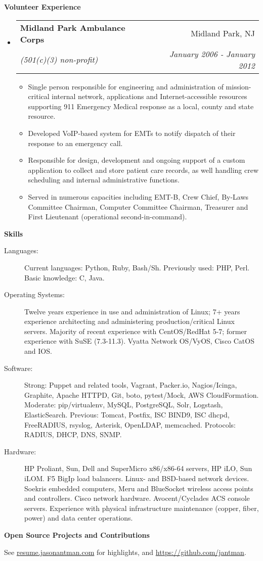 \documentclass[letterpaper,11pt]{article}
\makeatletter
\newcommand{\resitem}[1]{\item #1 \vspace{-2pt}}
\newcommand{\resheading}[1]{{\large \colorbox{mygrey}{\begin{minipage}{\textwidth}{\textbf{#1 \vphantom{p\^{E}}}}\end{minipage}}}}
\newcommand{\ressubheading}[4]{
\begin{tabular*}{7.0in}{l@{\extracolsep{\fill}}r}
		\textbf{#1} & #2 \\
		\textit{#3} & \textit{#4} \\
\end{tabular*}\vspace{-6pt}}
\makeatother
\begin{document}
\resheading{Volunteer Experience}
\begin{itemize}
\item
        \ressubheading{Midland Park Ambulance Corps}{Midland Park, NJ}{(501(c)(3) non-profit)}{January 2006 - January 2012}
        \begin{itemize}
                \resitem{Single person responsible for engineering and administration of
                  mission-critical internal network, applications and
                  Internet-accessible resources supporting 911 Emergency
                  Medical response as a local, county and state resource.}
                \resitem{Developed VoIP-based system for EMTs to notify
                  dispatch of their response to an emergency call.}
                \resitem{Responsible for design, development and ongoing support of a custom application to
                  collect and store patient care records, as well handling crew scheduling and internal
                  administrative functions.}
                \resitem{Served in numerous capacities including EMT-B, Crew Chief,
                  By-Laws Committee Chairman, Computer Committee Chairman,
                  Treasurer and First Lieutenant (operational second-in-command).}
        \end{itemize}
\end{itemize}

\resheading{Skills}

\begin{description}
\item[Languages:]
Current languages: Python, Ruby, Bash/Sh. Previously used: PHP, Perl. Basic knowledge: C, Java.
\item[Operating Systems:]
Twelve years experience in use and administration of Linux; 7+ years experience architecting and administering production/critical Linux servers.
Majority of recent experience with CentOS/RedHat 5-7; former experience with SuSE
(7.3-11.3). Vyatta Network OS/VyOS, Cisco CatOS and IOS.
\item[Software:]
Strong: Puppet and related tools, Vagrant, Packer.io, Nagios/Icinga, Graphite, Apache HTTPD, Git, boto, pytest/Mock, AWS CloudFormation.
Moderate: pip/virtualenv, MySQL, PostgreSQL, Solr, Logstash, ElasticSearch.
Previous: Tomcat, Postfix, ISC BIND9, ISC dhcpd, FreeRADIUS, rsyslog, Asterisk, OpenLDAP, memcached. Protocols: RADIUS, DHCP, DNS, SNMP.

\item[Hardware:]
HP Proliant, Sun, Dell and SuperMicro x86/x86-64 servers, HP iLO, Sun iLOM. F5 BigIp load balancers. Linux- and
BSD-based network devices. Soekris embedded computers, Meru and BlueSocket
wireless access points and controllers. Cisco network hardware. Avocent/Cyclades ACS console servers. Experience with physical infrastructure maintenance (copper, fiber, power) and data center operations.
\end{description}

\resheading{Open Source Projects and Contributions}
\begin{description}
\item{See \href{http://resume.jasonantman.com}{resume.jasonantman.com} for highlights, and \href{https://github.com/jantman}{https://github.com/jantman}.}
\end{description}
\end{document}
